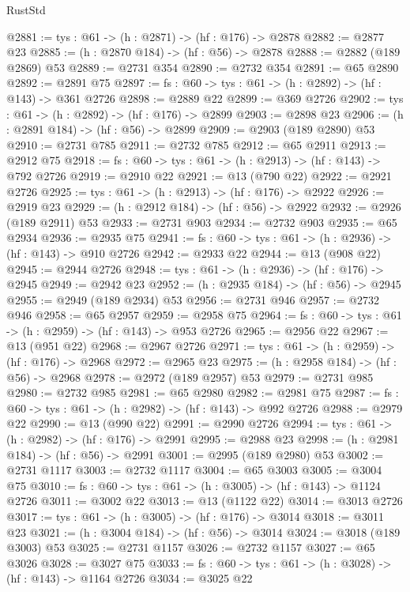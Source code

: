 \begin{lexlean}{RustStd}
\begin{coremodule}
{\begin{coremodule}
{{{{{{{{{{{{@2881 := {tys : @61} -> (h : @2871) -> (hf : @176) -> @2878
@2882 := @2877 @23
@2885 := (h : @2870 @184) -> (hf : @56) -> @2878
@2888 := @2882 (@189 @2869) @53
@2889 := @2731 @354
@2890 := @2732 @354
@2891 := @65 @2890
@2892 := @2891 @75
@2897 := {fs : @60} -> {tys : @61} -> (h : @2892) -> (hf : @143) -> @361 @2726
@2898 := @2889 @22
@2899 := @369 @2726
@2902 := {tys : @61} -> (h : @2892) -> (hf : @176) -> @2899
@2903 := @2898 @23
@2906 := (h : @2891 @184) -> (hf : @56) -> @2899
@2909 := @2903 (@189 @2890) @53
@2910 := @2731 @785
@2911 := @2732 @785
@2912 := @65 @2911
@2913 := @2912 @75
@2918 := {fs : @60} -> {tys : @61} -> (h : @2913) -> (hf : @143) -> @792 @2726
@2919 := @2910 @22
@2921 := @13 (@790 @22)
@2922 := @2921 @2726
@2925 := {tys : @61} -> (h : @2913) -> (hf : @176) -> @2922
@2926 := @2919 @23
@2929 := (h : @2912 @184) -> (hf : @56) -> @2922
@2932 := @2926 (@189 @2911) @53
@2933 := @2731 @903
@2934 := @2732 @903
@2935 := @65 @2934
@2936 := @2935 @75
@2941 := {fs : @60} -> {tys : @61} -> (h : @2936) -> (hf : @143) -> @910 @2726
@2942 := @2933 @22
@2944 := @13 (@908 @22)
@2945 := @2944 @2726
@2948 := {tys : @61} -> (h : @2936) -> (hf : @176) -> @2945
@2949 := @2942 @23
@2952 := (h : @2935 @184) -> (hf : @56) -> @2945
@2955 := @2949 (@189 @2934) @53
@2956 := @2731 @946
@2957 := @2732 @946
@2958 := @65 @2957
@2959 := @2958 @75
@2964 := {fs : @60} -> {tys : @61} -> (h : @2959) -> (hf : @143) -> @953 @2726
@2965 := @2956 @22
@2967 := @13 (@951 @22)
@2968 := @2967 @2726
@2971 := {tys : @61} -> (h : @2959) -> (hf : @176) -> @2968
@2972 := @2965 @23
@2975 := (h : @2958 @184) -> (hf : @56) -> @2968
@2978 := @2972 (@189 @2957) @53
@2979 := @2731 @985
@2980 := @2732 @985
@2981 := @65 @2980
@2982 := @2981 @75
@2987 := {fs : @60} -> {tys : @61} -> (h : @2982) -> (hf : @143) -> @992 @2726
@2988 := @2979 @22
@2990 := @13 (@990 @22)
@2991 := @2990 @2726
@2994 := {tys : @61} -> (h : @2982) -> (hf : @176) -> @2991
@2995 := @2988 @23
@2998 := (h : @2981 @184) -> (hf : @56) -> @2991
@3001 := @2995 (@189 @2980) @53
@3002 := @2731 @1117
@3003 := @2732 @1117
@3004 := @65 @3003
@3005 := @3004 @75
@3010 := {fs : @60} -> {tys : @61} -> (h : @3005) -> (hf : @143) -> @1124 @2726
@3011 := @3002 @22
@3013 := @13 (@1122 @22)
@3014 := @3013 @2726
@3017 := {tys : @61} -> (h : @3005) -> (hf : @176) -> @3014
@3018 := @3011 @23
@3021 := (h : @3004 @184) -> (hf : @56) -> @3014
@3024 := @3018 (@189 @3003) @53
@3025 := @2731 @1157
@3026 := @2732 @1157
@3027 := @65 @3026
@3028 := @3027 @75
@3033 := {fs : @60} -> {tys : @61} -> (h : @3028) -> (hf : @143) -> @1164 @2726
@3034 := @3025 @22
}}}}}}}}}}}}
\end{coremodule}}
\end{coremodule}
\end{lexlean}
